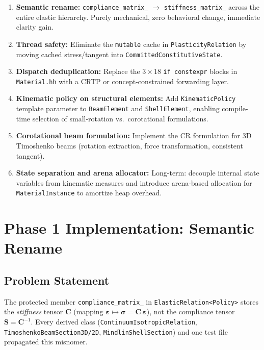 \begin{enumerate}
  \item \textbf{Semantic rename:}
        \texttt{compliance\_matrix\_} $\to$ \texttt{stiffness\_matrix\_}
        across the entire elastic hierarchy.
        Purely mechanical, zero behavioral change, immediate clarity gain.

  \item \textbf{Thread safety:}
        Eliminate the \texttt{mutable} cache in \texttt{PlasticityRelation}
        by moving cached stress/tangent into
        \texttt{CommittedConstitutiveState}.

  \item \textbf{Dispatch deduplication:}
        Replace the $3\times18$ \texttt{if constexpr} blocks in
        \texttt{Material.hh} with a CRTP or concept-constrained
        forwarding layer.

  \item \textbf{Kinematic policy on structural elements:}
        Add \texttt{KinematicPolicy} template parameter to
        \texttt{BeamElement} and \texttt{ShellElement}, enabling
        compile-time selection of small-rotation vs.\ corotational
        formulations.

  \item \textbf{Corotational beam formulation:}
        Implement the CR formulation for 3D Timoshenko beams
        (rotation extraction, force transformation, consistent tangent).

  \item \textbf{State separation and arena allocator:}
        Long-term: decouple internal state variables from kinematic
        measures and introduce arena-based allocation for
        \texttt{MaterialInstance} to amortize heap overhead.
\end{enumerate}


\section{Phase 1 Implementation: Semantic Rename}
\label{sec:phase1-rename}

\subsection{Problem Statement}

The protected member \texttt{compliance\_matrix\_} in
\texttt{ElasticRelation<Policy>} stores the \emph{stiffness} tensor
$\mathbf{C}$ (mapping $\boldsymbol{\varepsilon}\mapsto
\boldsymbol{\sigma}=\mathbf{C}\,\boldsymbol{\varepsilon}$), not the
compliance tensor $\mathbf{S}=\mathbf{C}^{-1}$.
Every derived class (\texttt{ContinuumIsotropicRelation},
\texttt{TimoshenkoBeamSection3D/2D}, \texttt{MindlinShellSection}) and
one test file propagated this misnomer.


